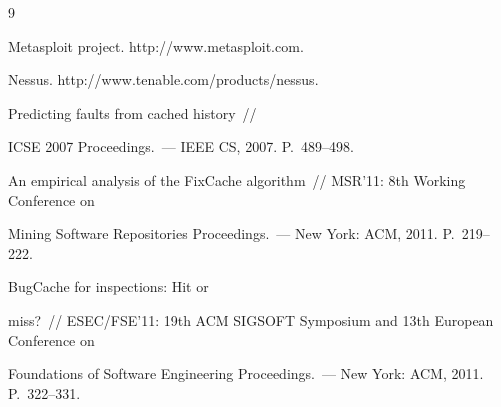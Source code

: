 {\small\frenchspacing


{%




\begin{thebibliography}{9}


    


  







Metasploit project. {\sf http://www.metasploit.com}.




Nessus. {\sf http://www.tenable.com/products/nessus}.




 Predicting faults from cached history~/\!\!/ 


ICSE 2007 Proceedings.~--- IEEE CS, 2007. P.~489--498.






An empirical analysis of the FixCache algorithm~/\!\!/ MSR'11: 8th Working Conference on 


Mining Software Repositories Proceedings.~--- New York: ACM, 2011. P.~219--222.







 \label{end\stat}


 


 BugCache for inspections: Hit or 


miss?~/\!\!/ ESEC/FSE'11: 19th ACM SIGSOFT Symposium and  13th European Conference on 


Foundations of Software Engineering Proceedings.~--- New York: ACM, 2011. P.~322--331.


 \end{thebibliography}


}


}


